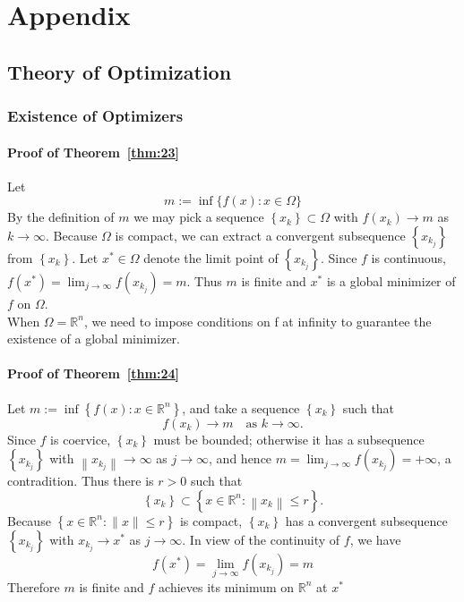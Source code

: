 \chapter{Appendix}
\renewcommand{\thesection}{\Alph{section}}
\label{appendix}
\section{Theory of Optimization}
\subsection{Existence of Optimizers}

\subsubsection{Proof of Theorem~\ref{thm:23}}
\label{appendix:trm23}
Let 
$$
m:=\inf \{f(x): x \in \Omega\}
$$
By the definition of $m$ we may pick a sequence $\left\{x_{k}\right\} \subset \Omega$ with $f\left(x_{k}\right) \rightarrow m$ as $k \rightarrow \infty$. Because $\Omega$ is compact, we can extract a convergent subsequence $\left\{x_{k_j}\right\}$ from $\left\{x_{k}\right\}$. Let $x^{*} \in \Omega$ denote the limit point of $\left\{x_{k_j}\right\}$. Since $f$ is continuous, $f\left(x^{*}\right)=\lim _{j \rightarrow \infty} f\left(x_{k_{j}}\right)=m$. Thus $m$ is finite and $x^{*}$ is a global minimizer of $f$ on $\Omega$. \\
When $\Omega = \mathbb{R}^n$, we need to impose conditions on f at infinity to guarantee the existence of a global minimizer.

\subsubsection{Proof of Theorem~\ref{thm:24}}
\label{appendix:trm24}
Let $m:=\inf \left\{f(x): x \in \mathbb{R}^{n}\right\}$, and take a sequence $\left\{x_{k}\right\}$ such that 
$$
f\left(x_{k}\right) \rightarrow m \quad \textrm{as }  k \rightarrow \infty .
$$
Since $f$ is coervice, $\left\{x_{k}\right\}$ must be bounded; otherwise it has a subsequence $\left\{x_{k_j}\right\}$ with $\left\|x_{k_{j}}\right\| \rightarrow \infty$ as $j \rightarrow \infty$, and hence $m=\lim _{j \rightarrow \infty} f\left(x_{k_{j}}\right)=+\infty$, a contradition. 
Thus there is $r > 0$ such that
$$
\left\{x_{k}\right\} \subset\left\{x \in \mathbb{R}^{n}:\left\|x_{k}\right\| \leq r\right\}.
$$
Because $\left\{x \in \mathbb{R}^{n}:\|x\| \leq r\right\}$ is compact, $\left\{x_{k}\right\}$ has a convergent subsequence $\left\{x_{k_j}\right\}$ with $x_{k_{j}} \rightarrow x^{*}$ as $j \rightarrow \infty$. In view of the continuity of $f$, we have 
$$
f\left(x^{*}\right)=\lim _{j \rightarrow \infty} f\left(x_{k_{j}}\right)=m
$$
Therefore $m$ is finite and $f$ achieves its minimum on $\mathbb{R}^n$ at $x^{*}$

